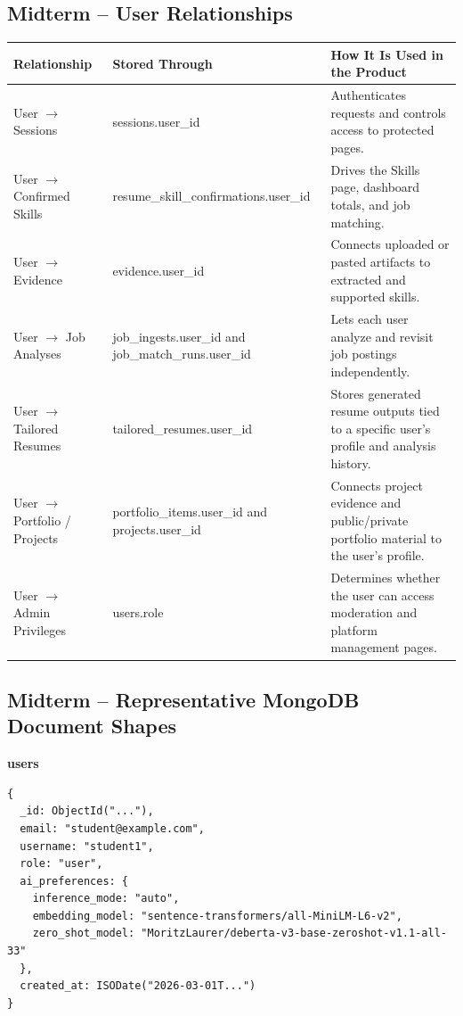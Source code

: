 \documentclass[11pt]{article}
\begin{document}
\subsection*{Midterm -- User Relationships}

\begin{table}[H]
  \renewcommand{\arraystretch}{1.2}
  \begin{tabularx}{\linewidth}{@{}p{1.7in}YY@{}}
    \toprule
    \textbf{Relationship} & \textbf{Stored Through} & \textbf{How It Is Used in the Product} \\
    \midrule
    User $\rightarrow$ Sessions & sessions.user\_id & Authenticates requests and controls access to protected pages. \\
    User $\rightarrow$ Confirmed Skills & resume\_skill\_confirmations.user\_id & Drives the Skills page, dashboard totals, and job matching. \\
    User $\rightarrow$ Evidence & evidence.user\_id & Connects uploaded or pasted artifacts to extracted and supported skills. \\
    User $\rightarrow$ Job Analyses & job\_ingests.user\_id and job\_match\_runs.user\_id & Lets each user analyze and revisit job postings independently. \\
    User $\rightarrow$ Tailored Resumes & tailored\_resumes.user\_id & Stores generated resume outputs tied to a specific user's profile and analysis history. \\
    User $\rightarrow$ Portfolio / Projects & portfolio\_items.user\_id and projects.user\_id & Connects project evidence and public/private portfolio material to the user's profile. \\
    User $\rightarrow$ Admin Privileges & users.role & Determines whether the user can access moderation and platform management pages. \\
    \bottomrule
  \end{tabularx}
\end{table}

\subsection*{Midterm -- Representative MongoDB Document Shapes}

\noindent
\textbf{users}
\begin{verbatim}
{
  _id: ObjectId("..."),
  email: "student@example.com",
  username: "student1",
  role: "user",
  ai_preferences: {
    inference_mode: "auto",
    embedding_model: "sentence-transformers/all-MiniLM-L6-v2",
    zero_shot_model: "MoritzLaurer/deberta-v3-base-zeroshot-v1.1-all-33"
  },
  created_at: ISODate("2026-03-01T...")
}
\end{verbatim}
\end{document}
